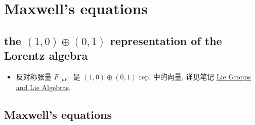 \chapter{Maxwell's equations}
\section{the \texorpdfstring{$(1, 0) \oplus (0, 1)$}{(1, 0)+(0, 1)} representation of the Lorentz algebra}
\begin{itemize}
	\item 反对称张量 $F_{[\mu \nu]}$ 是 $(1, 0) \oplus (0, 1)$ rep. 中的向量, 详见笔记 \href{https://github.com/siyang03/my-note---Lie-Groups-and-Lie-Algebras}{Lie Groups and Lie Algebras}.
\end{itemize}

\section{Maxwell's equations}
